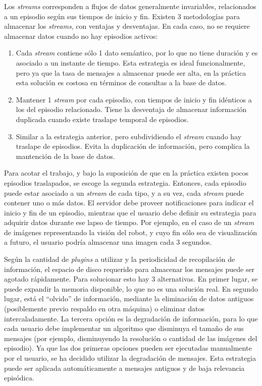 Los \textit{streams} corresponden a flujos de datos generalmente invariables, relacionados a un episodio según sus tiempos de inicio y fin. Existen 3 metodologías para almacenar los \textit{streams}, con ventajas y desventajas. En cada caso, no se requiere almacenar datos cuando no hay episodios activos:
\begin{enumerate}
	\item Cada \textit{stream} contiene sólo 1 dato semántico, por lo que no tiene duración y es asociado a un instante de tiempo. Esta estrategia es ideal funcionalmente, pero ya que la tasa de mensajes a almacenar puede ser alta, en la práctica esta solución es costosa en términos de consultas a la base de datos.
	\item Mantener 1 \textit{stream} por cada episodio, con tiempos de inicio y fin idénticos a los del episodio relacionado. Tiene la desventaja de almacenar información duplicada cuando existe traslape temporal de episodios.
	\item Similar a la estrategia anterior, pero subdividiendo el \textit{stream} cuando hay traslape de episodios. Evita la duplicación de información, pero complica la mantención de la base de datos.
\end{enumerate}

Para acotar el trabajo, y bajo la suposición de que en la práctica existen pocos episodios traslapados, se escoge la segunda estrategia. Entonces, cada episodio puede estar asociado a un \textit{stream} de cada tipo, y a su vez, cada \textit{stream} puede contener uno o más datos. El servidor debe proveer notificaciones para indicar el inicio y fin de un episodio, mientras que el usuario debe definir su estrategia para adquirir datos durante ese lapso de tiempo. Por ejemplo, en el caso de un \textit{stream} de imágenes representando la visión del robot, y cuyo fin sólo sea de visualización a futuro, el usuario podría almacenar una imagen cada 3 segundos. 

Según la cantidad de \textit{plugins} a utilizar y la periodicidad de recopilación de información, el espacio de disco requerido para almacenar los mensajes puede ser agotado rápidamente. Para solucionar esto hay 3 alternativas. En primer lugar, se puede expandir la memoria disponible, lo que no es una solución real. En segundo lugar, está el ``olvido'' de información, mediante la eliminación de datos antiguos (posiblemente previo respaldo en otra máquina) o eliminar datos intercaladamente. La tercera opción es la degradación de información, para lo que cada usuario debe implementar un algoritmo que disminuya el tamaño de sus mensajes (por ejemplo, disminuyendo la resolución o cantidad de las imágenes del episodio). Ya que las dos primeras opciones pueden ser ejecutadas manualmente por el usuario, se ha decidido utilizar la degradación de mensajes. Esta estrategia puede ser aplicada automáticamente a mensajes antiguos y de baja relevancia episódica.

